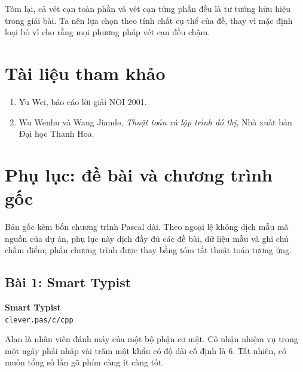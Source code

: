\documentclass[11pt]{article}
\begin{document}
Tóm lại, cả vét cạn toàn phần và vét cạn từng phần đều là tư tưởng hữu hiệu
trong giải bài. Ta nên lựa chọn theo tính chất cụ thể của đề, thay vì mặc
định loại bỏ vì cho rằng mọi phương pháp vét cạn đều chậm.

\section*{Tài liệu tham khảo}

\begin{enumerate}
  \item Yu Wei, báo cáo lời giải NOI 2001.
  \item Wu Wenhu và Wang Jiande, \textit{Thuật toán và lập trình đồ thị},
  Nhà xuất bản Đại học Thanh Hoa.
\end{enumerate}

\appendix
\section{Phụ lục: đề bài và chương trình gốc}

Bản gốc kèm bốn chương trình Pascal dài. Theo ngoại lệ không dịch mẫu mã nguồn
của dự án, phụ lục này dịch đầy đủ các đề bài, dữ liệu mẫu và ghi chú chấm
điểm; phần chương trình được thay bằng tóm tắt thuật toán tương ứng.

\subsection{Bài 1: Smart Typist}

\begin{center}
\textbf{Smart Typist}\\
\texttt{clever.pas/c/cpp}
\end{center}

Alan là nhân viên đánh máy của một bộ phận cơ mật. Cô nhận nhiệm vụ trong một
ngày phải nhập vài trăm mật khẩu có độ dài cố định là \(6\). Tất nhiên, cô
muốn tổng số lần gõ phím càng ít càng tốt.
\end{document}

